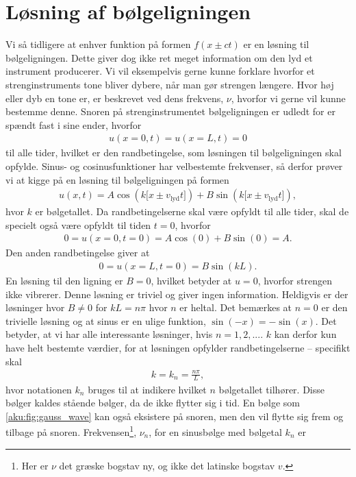 \section{Løsning af bølgeligningen}
Vi så tidligere at enhver funktion på formen $f(x\pm ct)$ er en løsning til bølgeligningen. Dette giver dog ikke ret meget information om den lyd et instrument producerer. Vi vil eksempelvis gerne kunne forklare hvorfor et strenginstruments tone bliver dybere, når man gør strengen længere. Hvor høj eller dyb en tone er, er beskrevet ved dens frekvens, $\nu$, hvorfor vi gerne vil kunne bestemme denne. Snoren på strenginstrumentet bølgeligningen er udledt for er spændt fast i sine ender, hvorfor
%
\begin{align} \label{aku:eq:randbetingelse}
    u(x=0,t) = u(x=L,t) = 0
\end{align}
%
til alle tider, hvilket er den randbetingelse, som løsningen til bølgeligningen skal opfylde. Sinus- og cosinusfunktioner har velbestemte frekvenser, så derfor prøver vi at kigge på en løsning til bølgeligningen på formen
%
\begin{align}
    u(x,t) = A\cos\left(k\big[x\pm v_\mathrm{lyd}t\big]\right) + B\sin\left(k\big[x\pm v_\mathrm{lyd}t\big]\right),
\end{align}
%
hvor $k$ er bølgetallet. Da randbetingelserne skal være opfyldt til alle tider, skal de specielt også være opfyldt til tiden $t=0$, hvorfor
%
\begin{align}
    0 = u(x=0,t=0) = A\cos(0) + B\sin(0) = A.
\end{align}
%
Den anden randbetingelse giver at
%
\begin{align}
    0 = u(x=L,t=0) = B\sin(kL).
\end{align}
%
En løsning til den ligning er $B = 0$, hvilket betyder at $u=0$, hvorfor strengen ikke vibrerer. Denne løsning er triviel og giver ingen information. Heldigvis er der løsninger hvor $B\neq0$ for $kL = n\pi$ hvor $n$ er heltal. Det bemærkes at $n=0$ er den trivielle løsning og at sinus er en ulige funktion, $\sin(-x) = -\sin(x)$. Det betyder, at vi har alle interessante løsninger, hvis $n = 1,2,...$. $k$ kan derfor kun have helt bestemte værdier, for at løsningen opfylder randbetingelserne -- specifikt skal
%
\begin{align}
    k = k_n = \frac{n\pi}{L},
\end{align}
%
hvor notationen $k_n$ bruges til at indikere hvilket $n$ bølgetallet tilhører. Disse bølger kaldes stående bølger, da de ikke flytter sig i tid. En bølge som \cref{aku:fig:gauss_wave} kan også eksistere på snoren, men den vil flytte sig frem og tilbage på snoren. Frekvensen\footnote{Her er $\nu$ det græske bogstav ny, og ikke det latinske bogstav $v$. }, $\nu_n$, for en sinusbølge med bølgetal $k_n$ er
